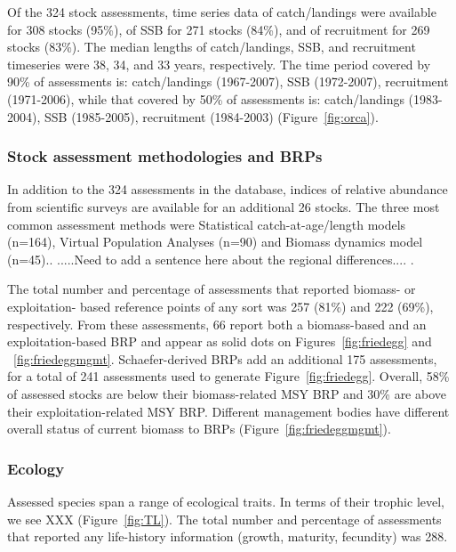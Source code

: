 Of the 324 stock assessments, time series data of
catch/landings were available for 308 stocks (95\%),
of SSB for 271 stocks (84\%), and of recruitment for
269 stocks (83\%).  The median lengths of
catch/landings, SSB, and recruitment timeseries were
38, 34, and 33 years,
respectively.  The time period covered by 90\%
of assessments is: catch/landings (1967-2007), SSB (1972-2007), recruitment
(1971-2006), while that covered by 50\% of assessments is: catch/landings
(1983-2004), SSB (1985-2005), recruitment (1984-2003) (Figure~\ref{fig:orca}).

\subsubsection*{Stock assessment methodologies and BRPs}
In addition to the 324 assessments in the
database, indices of relative abundance from scientific surveys are
available for an additional 26 stocks. The
three most common assessment methods were Statistical catch-at-age/length models (n=164),
Virtual Population Analyses (n=90) and Biomass dynamics model (n=45)..  .....Need
to add a sentence here about the regional differences.... .


The total number and percentage of assessments that reported biomass-
or exploitation- based reference points of any sort was
257 (81\%) and
222 (69\%),
respectively. From these assessments,
66 report both a biomass-based and an
exploitation-based BRP and appear as solid dots on
Figures~\ref{fig:friedegg} and ~\ref{fig:friedeggmgmt}. Schaefer-derived BRPs
add an additional 175 assessments, for
a total of 241 assessments used to generate
Figure~\ref{fig:friedegg}. Overall,
58\% of assessed stocks are below
their biomass-related MSY BRP and
30\% are above their
exploitation-related MSY BRP. Different management bodies have
different overall status of current biomass to BRPs
(Figure~\ref{fig:friedeggmgmt}).
 
\subsubsection*{Ecology}
Assessed species span a range of ecological traits. In terms of their
trophic level, we see XXX (Figure~\ref{fig:TL}). The total number and
percentage of assessments that reported any life-history information
(growth, maturity, fecundity) was 288.




